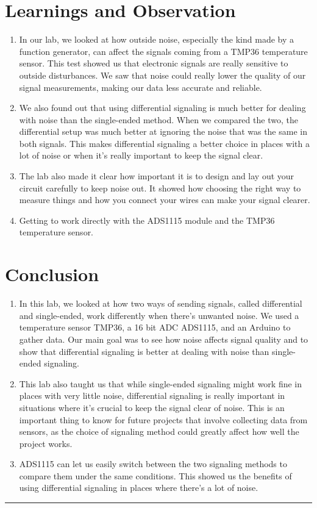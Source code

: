 \documentclass[a4paper,11pt]{article}%
\begin{document}
\section{Learnings and Observation}
\begin{enumerate}
	\item In our lab, we looked at how outside noise, especially the kind made by a function generator, can affect the signals coming from a TMP36 temperature sensor. This test showed us that electronic signals are really sensitive to outside disturbances. We saw that noise could really lower the quality of our signal measurements, making our data less accurate and reliable.

	\item We also found out that using differential signaling is much better for dealing with noise than the single-ended method. When we compared the two, the differential setup was much better at ignoring the noise that was the same in both signals. This makes differential signaling a better choice in places with a lot of noise or when it's really important to keep the signal clear.
	
	\item The lab also made it clear how important it is to design and lay out your circuit carefully to keep noise out. It showed how choosing the right way to measure things and how you connect your wires can make your signal clearer.
	
	\item Getting to work directly with the ADS1115 module and the TMP36 temperature sensor.
\end{enumerate}

\section{Conclusion}

\begin{enumerate}
	\item In this lab, we looked at how two ways of sending signals, called differential and single-ended, work differently when there's unwanted noise. We used a temperature sensor TMP36, a 16 bit ADC ADS1115, and an Arduino to gather data. Our main goal was to see how noise affects signal quality and to show that differential signaling is better at dealing with noise than single-ended signaling.
	\item  This lab also taught us that while single-ended signaling might work fine in places with very little noise, differential signaling is really important in situations where it's crucial to keep the signal clear of noise. This is an important thing to know for future projects that involve collecting data from sensors, as the choice of signaling method could greatly affect how well the project works.
	\item ADS1115 can let us easily switch between the two signaling methods to compare them under the same conditions. This showed us the benefits of using differential signaling in places where there's a lot of noise.
\end{enumerate}




\hrule






\end{document}
